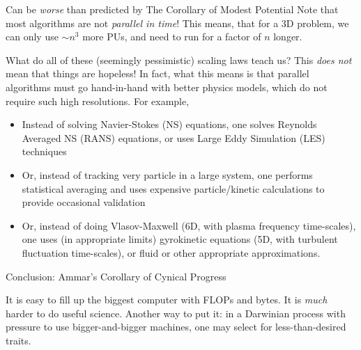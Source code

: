 \documentclass[aspectratio=169]{beamer}
\newcommand{\mypause}{\pause}
\begin{document}
\begin{frame}{Can be \emph{worse} than predicted by The
    Corollary of Modest Potential}
  Note that most algorithms are not \emph{parallel in time}! This
  means, that for a 3D problem, we can only use $\sim n^3$ more PUs,
  and need to run for a factor of $n$ longer.
\end{frame}

\begin{frame}{What do all of these (seemingly pessimistic) scaling
    laws teach us?}
  This \emph{does not} mean that things are hopeless! In fact, what
  this means is that parallel algorithms must go hand-in-hand with
  better physics models, which do not require such high
  resolutions. For example, 
  \begin{itemize}
  \item Instead of solving Navier-Stokes (NS) equations, one solves
    Reynolds Averaged NS (RANS) equations, or uses Large Eddy
    Simulation (LES) techniques%
    \mypause%
  \item Or, instead of tracking very particle in a large system, one
    performs statistical averaging and uses expensive particle/kinetic
    calculations to provide occasional validation
    \mypause%
  \item Or, instead of doing Vlasov-Maxwell (6D, with plasma frequency
    time-scales), one uses (in appropriate limits) gyrokinetic
    equations (5D, with turbulent fluctuation time-scales), or fluid
    or other appropriate approximations.
  \end{itemize}%
\end{frame}

\begin{frame}{Conclusion: Ammar's Corollary of Cynical Progress}

  {\color{blue} It is easy to fill up the biggest computer with FLOPs
    and bytes. It is \emph{much} harder to do useful science.}%
  \vskip0.1in%
  Another way to put it: in a Darwinian process with pressure to use
  bigger-and-bigger machines, one may select for less-than-desired
  traits.
\end{frame}
\end{document}
